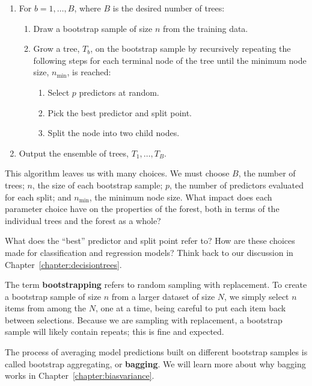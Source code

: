 \begin{enumerate}
\item For $b = 1, \dots, B$, where $B$ is the desired number of trees:
  \begin{enumerate}
  \item Draw a bootstrap sample of size $n$ from the training data.
  \item Grow a tree, $T_b$, on the bootstrap sample by recursively repeating the following steps for each terminal node of the tree until the minimum node size, $n_\text{min}$, is reached:
    \begin{enumerate}
    \item Select $p$ predictors at random.
    \item Pick the best predictor and split point.
    \item Split the node into two child nodes.
    \end{enumerate}
  \end{enumerate}
\item Output the ensemble of trees, $T_1, \dots, T_B$.
\end{enumerate}

\vspace{2mm}

\begin{question}{}
This algorithm leaves us with many choices. We must choose $B$, the number of trees; $n$, the size of each bootstrap sample; $p$, the number of predictors evaluated for each split; and $n_\text{min}$, the minimum node size. What impact does each parameter choice have on the properties of the forest, both in terms of the individual trees and the forest as a whole?
\end{question}

\begin{question}{}
What does the ``best'' predictor and split point refer to? How are these choices made for classification and regression models? Think back to our discussion in Chapter~\ref{chapter:decisiontrees}. 
\end{question}

The term \textbf{bootstrapping} refers to random sampling with replacement. To create a bootstrap sample of size $n$ from a larger dataset of size $N$, we simply select $n$ items from among the $N$, one at a time, being careful to put each item back between selections. Because we are sampling with replacement, a bootstrap sample will likely contain repeats; this is fine and expected.

The process of averaging model predictions built on different bootstrap samples is called bootstrap aggregating, or \textbf{bagging}. We will learn more about why bagging works in Chapter~\ref{chapter:biasvariance}.

